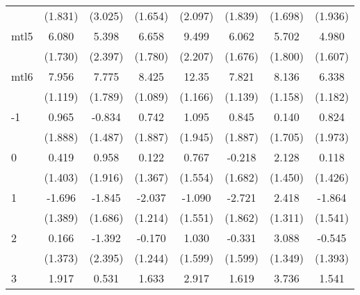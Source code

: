 \documentclass{article}
\begin{document}
{\begin{longtable}{l*{7}{c}}
                &  (1.831)         &  (3.025)         &  (1.654)         &  (2.097)         &  (1.839)         &  (1.698)         &  (1.936)         \\
mtl5            &    6.080\sym{**} &    5.398\sym{*}  &    6.658\sym{***}&    9.499\sym{***}&    6.062\sym{**} &    5.702\sym{**} &    4.980\sym{**} \\
                &  (1.730)         &  (2.397)         &  (1.780)         &  (2.207)         &  (1.676)         &  (1.800)         &  (1.607)         \\
mtl6            &    7.956\sym{***}&    7.775\sym{***}&    8.425\sym{***}&    12.35\sym{***}&    7.821\sym{***}&    8.136\sym{***}&    6.338\sym{***}\\
                &  (1.119)         &  (1.789)         &  (1.089)         &  (1.166)         &  (1.139)         &  (1.158)         &  (1.182)         \\
-1              &    0.965         &   -0.834         &    0.742         &    1.095         &    0.845         &    0.140         &    0.824         \\
                &  (1.888)         &  (1.487)         &  (1.887)         &  (1.945)         &  (1.887)         &  (1.705)         &  (1.973)         \\
0               &    0.419         &    0.958         &    0.122         &    0.767         &   -0.218         &    2.128         &    0.118         \\
                &  (1.403)         &  (1.916)         &  (1.367)         &  (1.554)         &  (1.682)         &  (1.450)         &  (1.426)         \\
1               &   -1.696         &   -1.845         &   -2.037         &   -1.090         &   -2.721         &    2.418         &   -1.864         \\
                &  (1.389)         &  (1.686)         &  (1.214)         &  (1.551)         &  (1.862)         &  (1.311)         &  (1.541)         \\
2               &    0.166         &   -1.392         &   -0.170         &    1.030         &   -0.331         &    3.088\sym{*}  &   -0.545         \\
                &  (1.373)         &  (2.395)         &  (1.244)         &  (1.599)         &  (1.599)         &  (1.349)         &  (1.393)         \\
3               &    1.917         &    0.531         &    1.633         &    2.917         &    1.619         &    3.736\sym{*}  &    1.541         \\

\end{longtable}}
\end{document}

